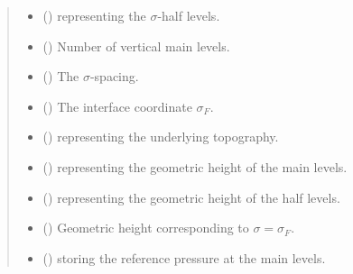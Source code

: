 \documentclass[letterpaper,10pt,english]{sphinxmanual}
\begin{document}
\begin{fulllineitems}
\begin{quote}
\begin{description}
\begin{itemize}
\item {} 
 () \textendash{} {\hyperref[\detokenize{api:tasmania.grids.axis.Axis}]{}} representing the \(\sigma\)-half levels.

\item {} 
 () \textendash{} Number of vertical main levels.

\item {} 
 () \textendash{} The \(\sigma\)-spacing.

\item {} 
 () \textendash{} The interface coordinate \(\sigma_F\).

\item {} 
{\hyperref[\detokenize{api:module-tasmania.grids.topography}]{}} () \textendash{} {\hyperref[\detokenize{api:tasmania.grids.topography.Topography2d}]{}} representing the underlying topography.

\item {} 
 () \textendash{}  representing the geometric height of the main levels.

\item {} 
 () \textendash{}  representing the geometric height of the half levels.

\item {} 
 () \textendash{} Geometric height corresponding to \(\sigma = \sigma_F\).

\item {} 
 () \textendash{}  storing the reference pressure at the main levels.


\end{itemize}
\end{description}
\end{quote}
\end{fulllineitems}
\end{document}
